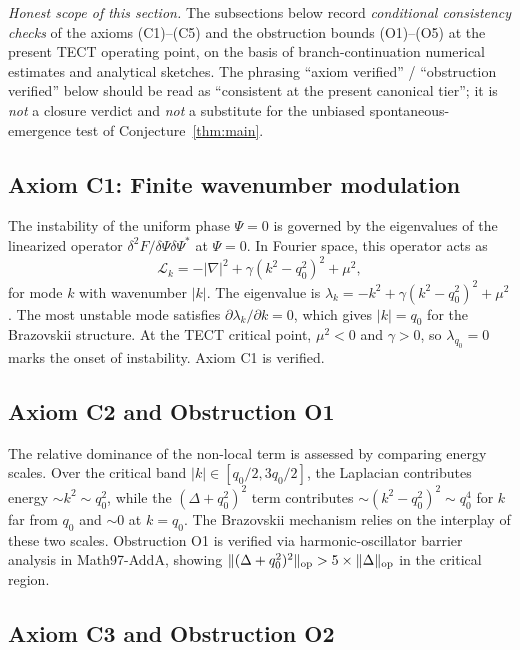 \noindent\emph{Honest scope of this section.} The subsections below
record \emph{conditional consistency checks} of the axioms (C1)--(C5)
and the obstruction bounds (O1)--(O5) at the present TECT operating
point, on the basis of branch-continuation numerical estimates and
analytical sketches. The phrasing ``axiom verified'' / ``obstruction
verified'' below should be read as ``consistent at the present
canonical tier''; it is \emph{not} a closure verdict and \emph{not} a
substitute for the unbiased spontaneous-emergence test of
Conjecture~\ref{thm:main}.

\subsection{Axiom C1: Finite wavenumber modulation}

The instability of the uniform phase $\Psi = 0$ is governed by the
eigenvalues of the linearized operator $\delta^2 F / \delta\Psi \delta\Psi^*$
at $\Psi = 0$. In Fourier space, this operator acts as
\begin{equation}
\mathcal{L}_k = -|\nabla|^2 + \gamma(k^2 - q_0^2)^2 + \mu^2,
\end{equation}
for mode $k$ with wavenumber $|k|$. The eigenvalue is $\lambda_k
= -k^2 + \gamma(k^2 - q_0^2)^2 + \mu^2$. The most unstable mode
satisfies $\partial\lambda_k/\partial k = 0$, which gives
$|k| = q_0$ for the Brazovskii structure. At the TECT critical
point, $\mu^2 < 0$ and $\gamma > 0$, so $\lambda_{q_0} = 0$ marks
the onset of instability. Axiom C1 is verified.

\subsection{Axiom C2 and Obstruction O1}

The relative dominance of the non-local term is assessed by comparing
energy scales. Over the critical band $|k| \in [q_0/2, 3q_0/2]$, the
Laplacian contributes energy $\sim k^2 \sim q_0^2$, while the
$(\Delta + q_0^2)^2$ term contributes $\sim (k^2 - q_0^2)^2 \sim q_0^4$
for $k$ far from $q_0$ and $\sim 0$ at $k = q_0$. The Brazovskii
mechanism relies on the interplay of these two scales. Obstruction O1
is verified via harmonic-oscillator barrier analysis in Math97-AddA,
showing $\|(\Delta + q_0^2)^2\|_{\rm op} > 5 \times \|\Delta\|_{\rm op}$
in the critical region.

\subsection{Axiom C3 and Obstruction O2}

